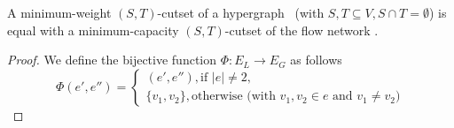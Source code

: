 \begin{theorem}
\label{theorem:st_cutset_equal_graph}
A minimum-weight $(S,T)$-cutset of a hypergraph \HypergraphDef~(with $S,T \subseteq V,
S \cap T = \emptyset$) is equal with a minimum-capacity $(S,T)$-cutset of the
flow network .
\label{theorem:heuer_network}
\end{theorem}

\begin{proof}


We define the bijective function $\Phi: E_L \rightarrow E_G$ as follows
\[ \Phi(e',e'') = 
   \begin{cases}
      (e',e''), \text{if } |e| \neq 2, \\
      \{v_1,v_2\}, \text{otherwise (with $v_1,v_2 \in e$ and $v_1 \neq v_2$)}
   \end{cases} \]


\end{proof}
